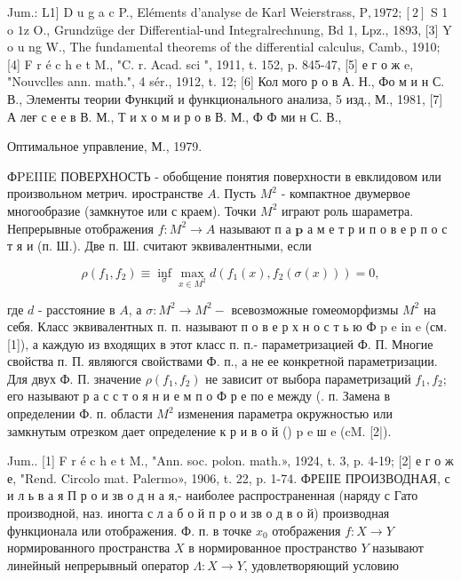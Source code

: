 \documentclass[10pt]{article}
\begin{document}
Jum.: L1] D u g a c P., Eléments d'analyse de Karl Weierstrass, $\mathrm{P}, 1972 ;[2]$ S 1 o $1 \mathrm{z}$ O., Grundzüge der Differential-und Integralrechnung, Bd 1, Lpz., 1893, [3] Y o u ng W., The fundamental theorems of the differential calculus, Camb., 1910; [4] F r é c h e t M., "C. r. Acad. sci ", 1911, t. 152, p. 845-47, [5] е г о ж e, "Nouvclles ann. math.", 4 sér., 1912, t. 12; [6] Кол мого р о в А. Н., Фо м и н С. В., Элементы теории Функций и функционального анализа, 5 изд., М., 1981, [7] А леғ с е е в В. М., Т и х о м и р о в В. М., Ф Ф ми н С. В.,

Оптимальное управление, М., 1979.



ФPEIIIE ПОВЕРХНОСТЬ - обобщение понятия поверхности в евклидовом или произвольном метрич. иространстве $A$. Пусть $M^{2}$ - компактное двумервое многообразие (замкнутое или с краем). Точки $M^{2}$ играют роль шараметра. Непрерывные отображения $f: M^{2} \rightarrow A$ называют п а $\mathbf{p}$ а м е т р и п о в е р п о с т я и (п. Ш.). Две п. Ш. считают эквивалентными, если



\[

\rho\left(f_{1}, f_{2}\right) \equiv \inf _{\sigma} \max _{x \in M^{2}} d\left(f_{1}(x), f_{2}(\sigma(x))\right)=0,

\]



где $d$ - расстояние в $A$, а $\sigma: M^{2} \rightarrow M^{2}-$ всевозможные гомеоморфизмы $M^{2}$ на себя. Класс эквивалентных п. п. называют п о в е р х н о с т ь ю Ф p e in e (см. [1]), а каждую из входящих в этот класс п. п.- параметризацией Ф. П. Многие свойства п. П. являюгся свойствами Ф. п., а не ее конкретной параметризации. Для двух Ф. П. значение $\rho\left(f_{1}, f_{2}\right)$ не зависит от выбора параметризаций $f_{1}, f_{2}$; его называют р а с с т о я н и е м п о Ф р е по е между (. п. Замена в определении Ф. п. области $M^{2}$ изменения параметра окружностью или замкнутым отрезком дает определение к р и в о й () p e ш e (cM. [2|).



Jum.. [1] F r é c h e t M., "Ann. soc. polon. math.», 1924, t. 3, p. 4-19; [2] е г о ж е, "Rend. Circolo mat. Palermo», 1906, t. 22, p. 1-74. ФРЕІІЕ ПРОИЗВОДНАЯ, с и л ь в а я П р о и зв о д н а я,- наиболее распространенная (наряду с Гато производной, наз. иногта с л а б о й п р о и зв о д в о й) производная функционала или отображения. Ф. п. в точке $x_{0}$ отображения $f: X \rightarrow Y$ нормированного пространства $X$ в нормированное пространство $Y$ называют линейный непрерывный оператор $\Lambda: X \rightarrow Y$, удовлетворяющий условию
\end{document}
